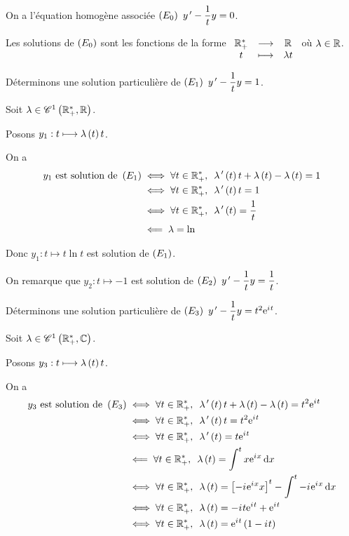 \begin{corr}
On a l'équation homogène associée \(\left(E_0\right)~y^{\,\prime}-\dfrac{1}{t}y=0\).

Les solutions de \(\left(E_0\right)\) sont les fonctions de la forme \(\begin{array}[t]{ccc}\mathbb{R}_+^* & \longrightarrow & \mathbb{R} \\ t & \longmapsto & \lambda t\end{array}\) où \(\lambda\in\mathbb{R}\).

Déterminons une solution particulière de \(\left(E_1\right)~y^{\,\prime}-\dfrac{1}{t}y=1\).

Soit \(\lambda\in\mathscr{C}^{1}\left(\mathbb{R}_+^*,\mathbb{R}\right)\).

Posons \(y_1:t\longmapsto\lambda\left(t\right)t\).

On a \[\begin{aligned}
y_1\text{ est solution de }\paren{E_1}&\ssi\quantifs{\forall t\in\Rps}\lambda\prim\paren{t}t+\lambda\paren{t}-\lambda\paren{t}=1 \\
&\ssi\quantifs{\forall t\in\Rps}\lambda\prim\paren{t}t=1 \\
&\ssi\quantifs{\forall t\in\Rps}\lambda\prim\paren{t}=\dfrac{1}{t} \\
&\impr\lambda=\ln
\end{aligned}\]

Donc \(y_1:t\mapsto t\ln t\) est solution de \(\left(E_1\right)\).

On remarque que \(y_2:t\mapsto-1\) est solution de \(\left(E_2\right)~y^{\,\prime}-\dfrac{1}{t}y=\dfrac{1}{t}\).

Déterminons une solution particulière de \(\left(E_3\right)~y^{\,\prime}-\dfrac{1}{t}y=t^2\mathrm{e}^{i\mkern1mu t}\).

Soit \(\lambda\in\mathscr{C}^{1}\left(\mathbb{R}_+^*,\mathbb{C}\right)\).

Posons \(y_3:t\longmapsto\lambda\left(t\right)t\).

On a \[\begin{aligned}
y_3\text{ est solution de }\paren{E_3}&\ssi\quantifs{\forall t\in\Rps}\lambda\prim\paren{t}t+\lambda\paren{t}-\lambda\paren{t}=t^2\e{\i t} \\
&\ssi\quantifs{\forall t\in\Rps}\lambda\prim\paren{t}t=t^2\e{\i t} \\
&\ssi\quantifs{\forall t\in\Rps}\lambda\prim\paren{t}=t\e{\i t} \\
&\impr\quantifs{\forall t\in\Rps}\lambda\paren{t}=\int^tx\e{\i x}\odif{x} \\
&\ssi\quantifs{\forall t\in\Rps}\lambda\paren{t}=\croch{-\i\e{\i x}x}^t-\int^t-\i\e{\i x}\odif{x} \\
&\ssi\quantifs{\forall t\in\Rps}\lambda\paren{t}=-\i t\e{\i t}+\e{\i t} \\
&\ssi\quantifs{\forall t\in\Rps}\lambda\paren{t}=\e{\i t}\paren{1-\i t}
\end{aligned}\]


\end{corr}
